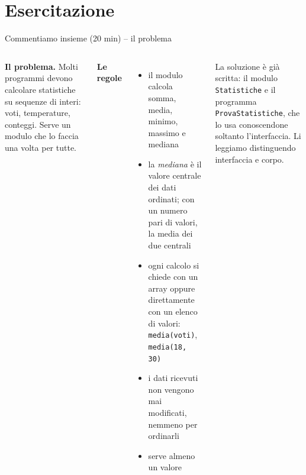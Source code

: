 \documentclass[10pt,aspectratio=169]{beamer}
\begin{document}
\section{Esercitazione}

\begin{frame}[fragile]{Commentiamo insieme (20 min) -- il problema}
\begin{columns}[T]
\small
\textbf{Il problema.} Molti programmi devono calcolare statistiche su sequenze di interi: voti, temperature, conteggi. Serve un modulo che lo faccia una volta per tutte.

\vspace{0.2cm}
\textbf{Le regole}
\begin{itemize}\itemsep=3pt
    \item il modulo calcola somma, media, minimo, massimo e mediana
    \item la \emph{mediana} è il valore centrale dei dati ordinati; con un numero pari di valori, la media dei due centrali
    \item ogni calcolo si chiede con un array oppure direttamente con un elenco di valori: \texttt{media(voti)}, \texttt{media(18, 30)}
    \item i dati ricevuti non vengono mai modificati, nemmeno per ordinarli
    \item serve almeno un valore
\end{itemize}

\vspace{0.2cm}
La soluzione è già scritta: il modulo \texttt{Statistiche} e il programma \texttt{ProvaStatistiche}, che lo usa conoscendone soltanto l'interfaccia. Li leggiamo distinguendo interfaccia e corpo.

\end{columns}
\end{frame}
\end{document}
